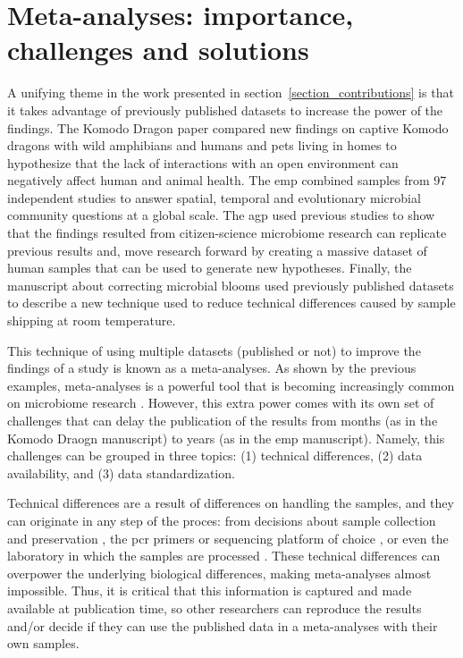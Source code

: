 \documentclass[12pt,chapterheads]{ucsd}
\begin{document}



\chapter{Meta-analyses: importance, challenges and solutions}\label{chapter_qiita}
\glsresetall
A unifying theme in the work presented in section~\ref{section_contributions}
is that it takes advantage of previously published datasets to increase the power
of the findings. The Komodo Dragon paper \cite{Hyde2016} compared new findings
on captive Komodo dragons with wild amphibians \cite{Kueneman2014} and humans and
pets living in homes \cite{Lax2014} to hypothesize that the lack of interactions
with an open environment can negatively affect human and animal health. The \gls{emp}
\cite{Gilbert2010, Gilbert2014, Thompson2017} combined samples from 97 independent
studies to answer spatial, temporal and evolutionary microbial community questions at a global scale.
The \gls{agp} used previous studies to show that the findings resulted from citizen-science
microbiome research can replicate previous results and, move research forward
by creating a massive dataset of human samples that can be used to
generate new hypotheses. Finally, the manuscript about correcting microbial blooms
\cite{Amir2017Bloom} used previously published datasets to describe a new technique
used to reduce technical differences caused by sample shipping at room temperature.

This technique of using multiple datasets (published or not)
to improve the findings of a study is known as a meta-analyses. As shown
by the previous examples, meta-analyses is a powerful tool that is becoming increasingly
common on microbiome research \cite{Lozupone2007, Ley2008, Sinha2017}. However,
this extra power comes with its own set of challenges that can delay the publication
of the results from months (as in the Komodo Draogn manuscript) to years (as in
the \gls{emp} manuscript). Namely, this challenges can be grouped in three topics:
(1) technical differences, (2) data availability, and (3) data standardization.

Technical differences are a result of differences on handling the samples, and
they can originate in any step of the proces: from decisions about sample collection and
preservation \cite{Song2016}, the \gls{pcr} primers or sequencing platform of choice
\cite{Kuczynski2011, Tremblay2015}, or even the laboratory in which the samples
are processed \cite{Sinha2017}. These technical differences can overpower
the underlying biological differences, making meta-analyses almost impossible. Thus,
it is critical that this information is captured and made available at publication
time, so other researchers can reproduce the results and/or decide if they can use
the published data in a meta-analyses with their own samples.
\end{document}
